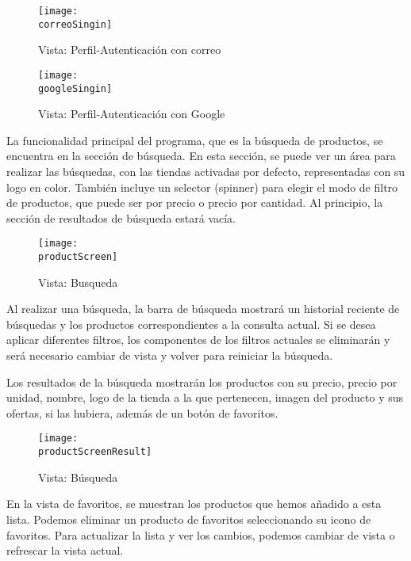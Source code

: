 \documentclass[12pt,twoside,titlepage]{report}
\newcommand{\correoSingin}{images/correo_singin.png}
\newcommand{\googleSingin}{images/gmail_singin.png}
\newcommand{\productScreen}{images/search_screen.png}
\newcommand{\productScreenResult}{images/search_result.png}
\begin{document}
\begin{figure}[H]
    \centering
	\texttt{[image: \\correoSingin]}
    \caption{Vista: Perfil-Autenticación con correo}
    \label{fig:Correo_Singin}
\end{figure}

\begin{figure}[H]
    \centering
	\texttt{[image: \\googleSingin]}
    \caption{Vista: Perfil-Autenticación con Google}
    \label{fig:Google_SingIn}
\end{figure}

La funcionalidad principal del programa, que es la búsqueda de productos, se encuentra en la sección de búsqueda. En esta sección, se puede ver un área para realizar las búsquedas, con las tiendas activadas por defecto, representadas con su logo en color. También incluye un selector (spinner) para elegir el modo de filtro de productos, que puede ser por precio o precio por cantidad. Al principio, la sección de resultados de búsqueda estará vacía.

\begin{figure}[H]
    \centering
	\texttt{[image: \\productScreen]}
    \caption{Vista: Busqueda}
    \label{fig:Google_SingIn}
\end{figure}

Al realizar una búsqueda, la barra de búsqueda mostrará un historial reciente de búsquedas y los productos correspondientes a la consulta actual. Si se desea aplicar diferentes filtros, los componentes de los filtros actuales se eliminarán y será necesario cambiar de vista y volver para reiniciar la búsqueda.

Los resultados de la búsqueda mostrarán los productos con su precio, precio por unidad, nombre, logo de la tienda a la que pertenecen, imagen del producto y sus ofertas, si las hubiera, además de un botón de favoritos.

\begin{figure}[H]
    \centering
	\texttt{[image: \\productScreenResult]}
    \caption{Vista: Búsqueda}
    \label{fig:Google_SingIn}
\end{figure}

En la vista de favoritos, se muestran los productos que hemos añadido a esta lista. Podemos eliminar un producto de favoritos seleccionando su icono de favoritos. Para actualizar la lista y ver los cambios, podemos cambiar de vista o refrescar la vista actual.
\end{document}

